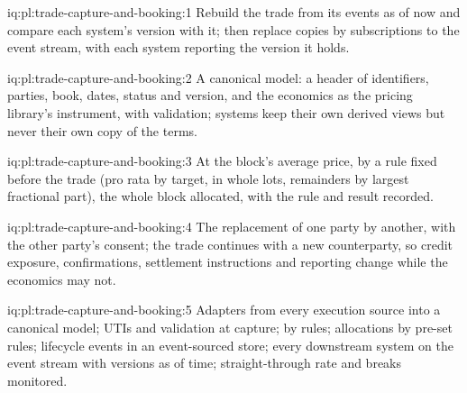 \begin{solution}{iq:pl:trade-capture-and-booking:1}
Rebuild the trade from its events as of now and compare each system's version with it; then replace copies by subscriptions to the event stream,
with each system reporting the version it holds.
\end{solution}

\begin{solution}{iq:pl:trade-capture-and-booking:2}
A canonical model: a header of identifiers, parties, book, dates, status and version, and the economics as the pricing library's instrument, with
validation; systems keep their own derived views but never their own copy of the terms.
\end{solution}

\begin{solution}{iq:pl:trade-capture-and-booking:3}
At the block's average price, by a rule fixed before the trade (pro rata by target, in whole lots, remainders by largest fractional part), the
whole block allocated, with the rule and result recorded.
\end{solution}

\begin{solution}{iq:pl:trade-capture-and-booking:4}
The replacement of one party by another, with the other party's consent; the trade continues with a new counterparty, so credit exposure,
confirmations, settlement instructions and reporting change while the economics may not.
\end{solution}

\begin{solution}{iq:pl:trade-capture-and-booking:5}
Adapters from every execution source into a canonical model; UTIs and validation at capture;  by rules; allocations by pre-set rules;
lifecycle events in an event-sourced store; every downstream system on the event stream with versions as of time; straight-through rate and
breaks monitored.
\end{solution}
